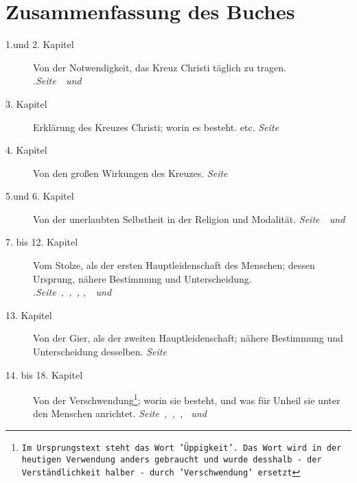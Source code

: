 \documentclass[a5paper,pagesize,9pt]{scrbook}
\begin{document}
\chapter{Zusammenfassung des Buches}
\begin{description}
\item[1.und 2. Kapitel] Von der Notwendigkeit, das Kreuz Christi täglich zu
tragen.\\
.\dotfill \textit{Seite~\pageref{kap1}~und~\pageref{kap2}}\\
\item[3. Kapitel] Erklärung des Kreuzes Christi; worin es besteht. etc.
\dotfill \textit{Seite~\pageref{kap3}}\\
\item[4. Kapitel] Von den großen Wirkungen des Kreuzes.
\dotfill \textit{Seite~\pageref{kap4}}\\
\item[5.und 6. Kapitel] Von der unerlaubten Selbstheit in der Religion und
Modalität.
\dotfill \textit{Seite~\pageref{kap5}~und~\pageref{kap6}}\\
\item[7. bis 12. Kapitel] Vom Stolze, als der ersten Hauptleidenschaft des
Menschen; dessen Ursprung, nähere Bestimmung und Unterscheidung.\\
.\dotfill \textit{Seite~\pageref{kap7},~\pageref{kap8},~\pageref{kap9}, \pageref{kap10},~\pageref{kap11}~und~\pageref{kap12}}\\
\item[13. Kapitel] Von der Gier, als der zweiten Hauptleidenschaft; nähere
Bestimmung und Unterscheidung desselben.
\dotfill \textit{Seite~\pageref{kap13}}\\
\item[14. bis 18. Kapitel] Von der Verschwendung\footnote{\texttt{Im Ursprungstext steht
das Wort 'Üppigkeit'. Das Wort wird in der heutigen Verwendung anders
gebraucht und wurde desshalb - der Verständlichkeit halber - durch
'Verschwendung' ersetzt}}; worin sie besteht, und was für Unheil sie unter den
Menschen anrichtet.
\dotfill \textit{Seite~\pageref{kap14},~\pageref{kap15},~\pageref{kap16},
\pageref{kap17}~und~\pageref{kap18}}\\
\end{description}

\end{document}
